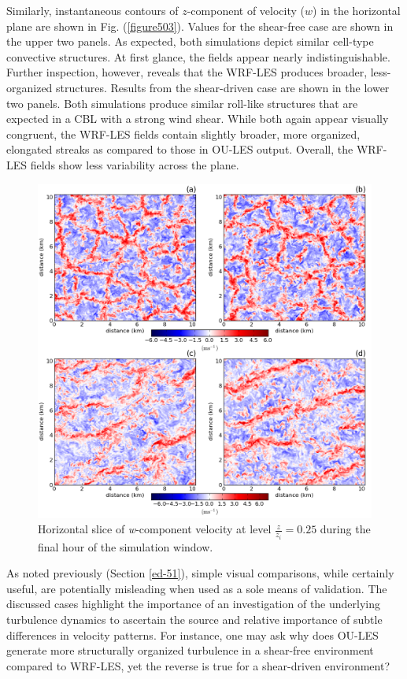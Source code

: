 Similarly, instantaneous contours of $z$-component of velocity ($w$) in the horizontal plane are shown in Fig. (\autoref{figure503}). Values for the shear-free case are shown in the upper two panels. As expected, both simulations depict similar cell-type convective structures. At first glance, the fields appear nearly indistinguishable. Further inspection, however, reveals that the WRF-LES produces broader, less-organized structures. Results from the shear-driven case are shown in the lower two panels. Both simulations produce similar roll-like structures that are expected in a CBL with a strong wind shear. While both again appear visually congruent, the WRF-LES fields contain slightly broader, more organized, elongated streaks as compared to those in OU-LES output. Overall, the WRF-LES fields show less variability across the plane.


\begin{figure}[!ht]
\begin{center}
\includegraphics[width=\textwidth]{figures/chapter5/w_slice}
\end{center}
\caption{Horizontal slice of \textit{w}-component velocity at level $\frac{z}{z_i} = 0.25$ during the final hour of the simulation window.}
\label{figure503}
\end{figure}


As noted previously (Section \autoref{ed-51}), simple visual comparisons, while certainly useful, are potentially misleading when used as a sole means of validation. The discussed cases highlight the importance of an investigation of the underlying turbulence dynamics to ascertain the source and relative importance of subtle differences in velocity patterns. For instance, one may ask why does OU-LES generate more structurally organized turbulence in a shear-free environment compared to WRF-LES, yet the reverse is true for a shear-driven environment? 

